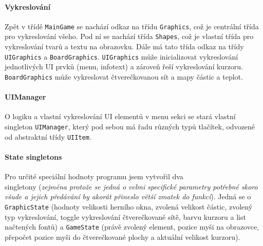 \documentclass[a4paper, 12pt]{article}
\begin{document}
\paragraph{Vykreslování}
Zpět v třídě \texttt{MainGame} se nachází odkaz na třídu \texttt{Graphics}, což
je centrální třída pro vykreslování všeho. Pod ní se nachází třída
\texttt{Shapes}, což je vlastní třída pro vykreslování tvarů a textu na
obrazovku. Dále má tato třída odkaz na třídy \texttt{UIGraphics} a
\texttt{BoardGraphics}. \texttt{UIGraphics} může inicializovat vykreslování
jednotlivých UI prvků (menu, infotext) a zároveň řeší vykreslování kurzoru.
\texttt{BoardGraphics} může vykreslovat čtverečkovanou sít a mapy částic a
teplot.

\paragraph{UIManager}
O logiku a vlastní vykreslování UI elementů v menu sekci se stará vlastní
singleton \texttt{UIManager}, který pod sebou má řadu různých typů tlačítek,
odvozené od abstraktní třídy \texttt{UIItem}.

\paragraph{State singletons}
Pro určité speciální hodnoty programu jsem vytvořil dva \\singletony (\emph{zejména
protože se jedná o velmi specifické parametry potřebné skoro všude a jejich
předávání by akorát přineslo větší zmatek do funkcí}). Jedná se o
\texttt{GraphicState} (hodnoty velikosti herního okna, zvolená
velikost částic, zvolený typ vykreslování, toggle vykreslování čtverečkované
sítě, barvu kurzoru a list načtených fontů) a \texttt{GameState} (právě zvolený
element, pozice myši na obrazovce, přepočet pozice myši do čtverečkované plochy
a aktuální velikost kurzoru).

\newpage
\end{document}
